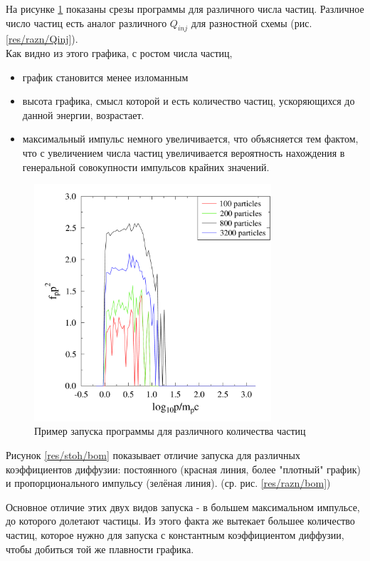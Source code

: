 \documentclass[a4paper,14pt]{extarticle} %
\begin{document}
На рисунке \ref{res/stoh/particles} показаны срезы программы для различного числа частиц. Различное число частиц есть аналог различного $Q_{inj}$ для разностной схемы (рис. \ref{res/razn/Qinj}).\\
 Как видно из этого графика, с ростом числа частиц,
\begin{itemize}
\item график становится менее изломанным
\item высота графика, смысл которой и есть количество частиц, ускоряющихся до данной энергии, возрастает.
\item максимальный импульс немного увеличивается, что объясняется тем фактом, что с увеличением числа частиц увеличивается вероятность нахождения в генеральной совокупности импульсов крайних значений.
\end{itemize}
\begin{figure}[H]
\centering
\includegraphics[width=250pt]{stoh_particles}
\caption{Пример запуска программы для различного количества частиц}
\label{res/stoh/particles}
\end{figure}
Рисунок \ref{res/stoh/bom} показывает отличие запуска для различных коэффициентов диффузии: постоянного (красная линия, более "плотный" график) и пропорционального импульсу (зелёная линия). (ср. рис. \ref{res/razn/bom})

Основное отличие этих двух видов запуска - в большем максимальном импульсе, до которого долетают частицы. Из этого факта же вытекает большее количество частиц, которое нужно для запуска с константным коэффициентом диффузии, чтобы добиться той же плавности графика.
\end{document}

